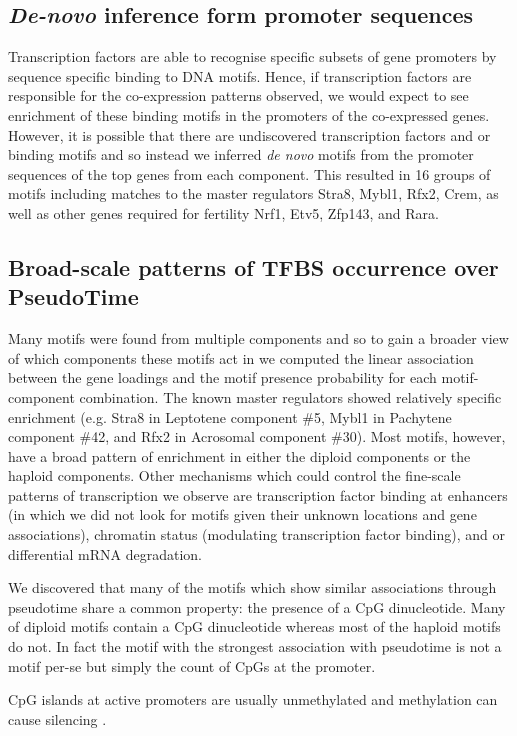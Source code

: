 \subsection{\emph{De-novo} inference form promoter sequences}
Transcription factors are able to recognise specific subsets of gene promoters by sequence specific binding to DNA motifs. Hence, if transcription factors are responsible for the co-expression patterns observed, we would expect to see enrichment of these binding motifs in the promoters of the co-expressed genes. However, it is possible that there are undiscovered transcription factors and or binding motifs and so instead we inferred \textit{de novo} motifs from the promoter sequences of the top genes from each component. This resulted in 16 groups of motifs including matches to the master regulators Stra8, Mybl1, Rfx2, Crem, as well as other genes required for fertility Nrf1, Etv5, Zfp143, and Rara.

\subsection{Broad-scale patterns of TFBS occurrence over PseudoTime}
Many motifs were found from multiple components and so to gain a broader view of which components these motifs act in we computed the linear association between the gene loadings and the motif presence probability for each motif-component combination. The known master regulators showed relatively specific enrichment (e.g. Stra8 in Leptotene component \#5, Mybl1 in Pachytene component \#42, and Rfx2 in Acrosomal component \#30). Most motifs, however, have a broad pattern of enrichment in either the diploid components or the haploid components. Other mechanisms which could control the fine-scale patterns of transcription we observe are transcription factor binding at enhancers (in which we did not look for motifs given their unknown locations and gene associations), chromatin status (modulating transcription factor binding), and or differential mRNA degradation.

We discovered that many of the motifs which show similar associations through pseudotime share a common property: the presence of a CpG dinucleotide. Many of diploid motifs contain a CpG dinucleotide whereas most of the haploid motifs do not. In fact the motif with the strongest association with pseudotime is not a motif per-se but simply the count of CpGs at the promoter.

CpG islands at active promoters are usually unmethylated and methylation can cause silencing \parencite{Li2014DNA}. 

